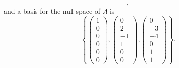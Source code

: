 \documentclass[12pt]{article}
\begin{document}
\begin{enumerate}[label=(\alph*)]
\begin{equation*}
		,
	\end{equation*}
	and a basis for the null space of $A$ is
	\begin{equation*}
		\boxed{
			\left\{
				\begin{pmatrix} 1 \\ 0 \\ 0 \\ 0 \\ 0 \\ 0 \end{pmatrix},
				\begin{pmatrix} 0 \\ 2 \\ -1 \\ 1 \\ 0 \\ 0 \end{pmatrix},
				\begin{pmatrix} 0 \\ -3 \\ -4 \\ 0 \\ 1 \\ 1 \end{pmatrix}
			\right\}
		}
		.
	\end{equation*}
\end{enumerate}
\end{document}
